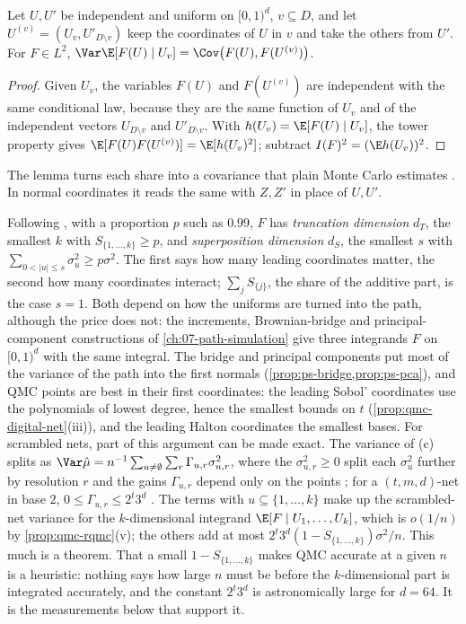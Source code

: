 \begin{lemma}\label{lem:qmc-pick-freeze}
Let $U,U'$ be independent and uniform on $[0,1)^d$, $v\subseteq D$, and let
$U^{(v)}=(U_v,U'_{D\setminus v})$ keep the coordinates of $U$ in $v$ and take the others from
$U'$. For $F\in L^2$, $\Var\E[F(U)\mid U_v]=\Cov\big(F(U),F(U^{(v)})\big)$.
\end{lemma}

\begin{proof}
Given $U_v$, the variables $F(U)$ and $F(U^{(v)})$ are independent with the same conditional
law, because they are the same function of $U_v$ and of the independent vectors
$U_{D\setminus v}$ and $U'_{D\setminus v}$. With $h(U_v)=\E[F(U)\mid U_v]$, the tower property
gives $\E[F(U)F(U^{(v)})]=\E[h(U_v)^2]$; subtract $I(F)^2=(\E h(U_v))^2$.
\end{proof}

The lemma turns each share into a covariance that plain Monte Carlo estimates
\citep{sobol-2001}. In normal coordinates it reads the same with $Z,Z'$ in place of $U,U'$.

\begin{remark}\label{rem:qmc-effective-dimension}
Following \textcite{caflisch-morokoff-owen}, with a proportion $p$ such as $0.99$, $F$ has
\emph{truncation dimension} $d_T$, the smallest $k$ with $S_{\{1,\dots,k\}}\ge p$, and
\emph{superposition dimension} $d_S$, the smallest $s$ with
$\sum_{0<|u|\le s}\sigma_u^2\ge p\sigma^2$. The first says how many leading coordinates matter,
the second how many coordinates interact; $\sum_jS_{\{j\}}$, the share of the additive part, is
the case $s=1$. Both depend on how the uniforms are turned into the path, although the price does
not: the increments, Brownian-bridge and principal-component constructions of
\cref{ch:07-path-simulation} give three integrands $F$ on $[0,1)^d$ with the same integral. The
bridge and principal components put most of the variance of the path into the first normals
(\cref{prop:ps-bridge,prop:ps-pca}), and QMC points are best in their first coordinates: the
leading Sobol' coordinates use the polynomials of lowest degree, hence the smallest bounds on $t$
(\cref{prop:qmc-digital-net}(iii)), and the leading Halton coordinates the smallest bases. For scrambled nets, part of this argument can be
made exact. The variance of (c) splits as $\Var\hat\mu=n^{-1}\sum_{u\ne\emptyset}\sum_r
\Gamma_{u,r}\sigma^2_{u,r}$, where the $\sigma^2_{u,r}\ge0$ split each $\sigma_u^2$ further by
resolution $r$ and the gains $\Gamma_{u,r}$ depend only on the points \citep{owen-scrambled-nets};
for a $(t,m,d)$-net in base $2$, $0\le\Gamma_{u,r}\le2^t3^d$ \citep{owen-1998}. The terms with $u\subseteq\{1,\dots,k\}$ make up the scrambled-net variance for
the $k$-dimensional integrand $\E[F\mid U_1,\dots,U_k]$, which is $o(1/n)$ by
\cref{prop:qmc-rqmc}(v); the others add at most $2^t3^d(1-S_{\{1,\dots,k\}})\sigma^2/n$. This much
is a theorem. That a small $1-S_{\{1,\dots,k\}}$ makes QMC accurate at a given $n$ is a
heuristic: nothing says how large $n$ must be before the $k$-dimensional part is integrated
accurately, and the constant $2^t3^d$ is astronomically large for $d=64$. It is the measurements
below that support it.
\end{remark}

